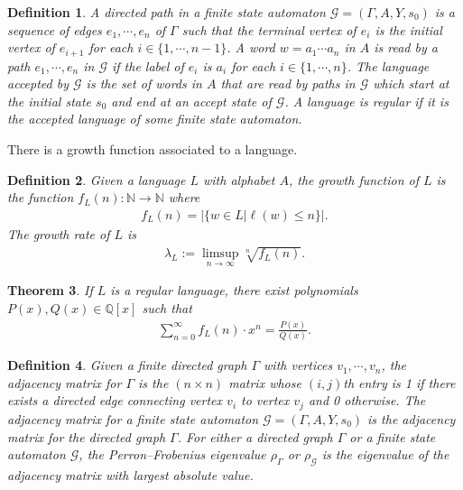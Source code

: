 \documentclass[10pt,a4paper]{amsart}
\newtheorem{theorem}{Theorem}[section]
\newtheorem{definition}[theorem]{Definition}
\begin{document}
\begin{definition}
    A \emph{directed path} in a finite state automaton $\mathcal{G} = (\Gamma, A, Y, s_0)$ is a sequence of edges $e_1, \cdots, e_n$ of $\Gamma$ such that the terminal vertex of $e_i$ is the initial vertex of $e_{i+1}$ for each $i \in \{1, \cdots, n-1\}$. A word $w = a_1 \cdots a_n$ in $A$ is \emph{read} by a path $e_1, \cdots, e_n$ in $\mathcal{G}$ if the label of $e_i$ is $a_i$ for each $i \in \{1, \cdots, n \}$. The \emph{language accepted by} $\mathcal{G}$ is the set of words in $A$ that are read by paths in $\mathcal{G}$ which start at the initial state $s_0$ and end at an accept state of $\mathcal{G}$. A language is \emph{regular} if it is the accepted language of some finite state automaton. 
\end{definition}

There is a growth function associated to a language.
\begin{definition}
    Given a language $L$ with alphabet $A$, the \emph{growth function} of $L$ is the function $f_{L}(n) : \mathbb{N} \rightarrow \mathbb{N}$ where
    \begin{align*}
        f_L(n) = |\{w \in L | \ell(w) \leq n\}|\text{.}
    \end{align*}
    The \emph{growth rate} of $L$ is
    \begin{align*}
        \lambda_{L} := \limsup_{n \rightarrow \infty} \sqrt[n]{f_{L}(n)}\text{.}
    \end{align*}
\end{definition}

\begin{theorem}\cite[Theorem~7]{Cannon-regular-geodesics}\label{thm:polynomial-growth}
    If $L$ is a regular language, there exist polynomials $P(x), Q(x) \in \mathbb{Q}[x]$ such that
    \begin{align*}
        \sum_{n=0}^{\infty} f_L(n) \cdot x^n  = \frac{P(x)}{Q(x)}\text{.}
    \end{align*}
\end{theorem}

\begin{definition}
    Given a finite directed graph $\Gamma$ with vertices $v_1, \cdots, v_n$, the \emph{adjacency matrix} for $\Gamma$ is the $(n \times n)$ matrix whose $(i,j)$th entry is 1 if there exists a directed edge connecting vertex $v_i$ to vertex $v_j$ and 0 otherwise. The \emph{adjacency matrix for a finite state automaton} $\mathcal{G} = (\Gamma, A, Y, s_0)$ is the adjacency matrix for the directed graph $\Gamma$. For either a directed graph $\Gamma$ or a finite state automaton $\mathcal{G}$, the \emph{Perron--Frobenius eigenvalue} $\rho_{\Gamma}$ or $\rho_{\mathcal{G}}$ is the eigenvalue of the adjacency matrix with largest absolute value.
\end{definition}
\end{document}
